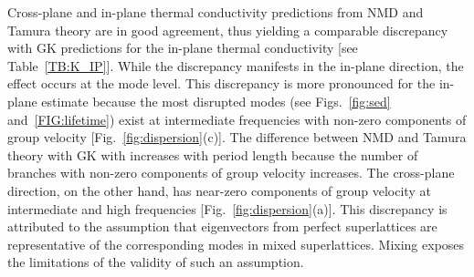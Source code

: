 \documentclass[aps,prb,preprint,preprintnumbers,amsmath,amssymb,floatfix,superscriptaddress]{revtex4}
\newcommand{\kv}{\mspace{-4.0mu}\left(\mspace{-8.0mu}
\begin{smallmatrix}&\pmb{\kappa} \\&\nu\end{smallmatrix}
\mspace{-3.0mu}\right)}
\begin{document}
Cross-plane and in-plane thermal conductivity predictions from NMD and Tamura theory are in good agreement, thus yielding a comparable discrepancy with GK predictions for the in-plane thermal conductivity [see Table~\ref{TB:K_IP}]. While the discrepancy manifests in the in-plane direction, the effect occurs at the mode level. This discrepancy is more pronounced for the in-plane estimate because the most disrupted modes (see Figs.~\ref{fig:sed} and~\ref{FIG:lifetime}) exist at intermediate frequencies with non-zero components of group velocity [Fig.~\ref{fig:dispersion}(c)]. The difference between NMD and Tamura theory with GK with increases with period length because the number of branches with non-zero components of group velocity increases. The cross-plane direction, on the other hand, has near-zero components of group velocity at intermediate and high frequencies [Fig.~\ref{fig:dispersion}(a)]. This discrepancy is attributed to the assumption that eigenvectors from perfect superlattices are representative of the corresponding modes in mixed superlattices. Mixing exposes the limitations of the validity of such an assumption.


\end{document}
